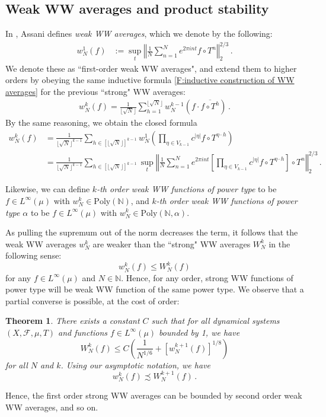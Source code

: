 \documentclass[11pt, oneside]{amsart}   	%
\newcommand{\1}{\mathbbm{1}}
\newcommand{\N}{\mathbb{N}}
\newcommand{\floor}[1]{\lfloor#1\rfloor}
\newtheorem{theorem}{Theorem}[section]
\theoremstyle{definition}
\begin{document}
\subsection{Weak WW averages and product stability}\label{S:WWW}

In \cite{assani04}, Assani defines \textit{weak WW averages}, which we denote by the following:
\begin{align*}
    w_N^1(f) &:= \sup_t \left\Vert \frac{1}{N} \sum_{n=1}^N e^{2\pi i n t} f \circ T^n \right\Vert_2^{2/3} \, .
\end{align*}
We denote these as ``first-order weak WW averages", and extend them to higher orders by obeying the same inductive formula \ref{F:inductive construction of WW averages} for the previous ``strong" WW averages:
\begin{align}\label{F:inductive construction of weak WW averages}
w^{k}_N(f) = \frac{1}{\floor{\sqrt{N}}}\sum_{h=1}^{\floor{\sqrt{N}}} w^{k-1}_N \left( f \cdot \overline{f \circ T^h} \right) \, .
\end{align}
By the same reasoning, we obtain the closed formula
\begin{align*}
w^{k}_N(f) &= \frac{1}{\floor{\sqrt{N}}^{k-1}}\sum_{h\in [\floor{\sqrt{N}}]^{k-1}} w^{1}_N \left( \prod_{\eta\in V_{k-1}} c^{|\eta|} f\circ T^{\eta \cdot h} \right) \\
&=\frac{1}{\floor{\sqrt{N}}^{k-1}}\sum_{h\in [\floor{\sqrt{N}}]^{k-1}} \sup_t \left\Vert \frac{1}{N} \sum_{n=1}^N e^{2\pi i n t}\left[\prod_{\eta\in V_{k-1}} c^{|\eta|} f\circ T^{\eta \cdot h} \right]\circ T^n \right\Vert_2^{2/3} \, .
\end{align*}

Likewise, we can define \textit{$k$-th order weak WW functions of power type} to be $f\in L^\infty(\mu)$ with $w_N^k \in \text{Poly}(\N)$, and \textit{$k$-th order weak WW functions of power type $\alpha$} to be $f\in L^\infty(\mu)$ with $w_N^k \in \text{Poly}(\N, \alpha)$.

As pulling the supremum out of the norm decreases the term, it follows that the weak WW averages $w_N^k$ are weaker than the ``strong" WW averages $W_N^k$ in the following sense:
$$w_N^k(f) \leq W_N^k(f)$$
for any $f\in L^\infty(\mu)$ and $N\in\N$. Hence, for any order, strong WW functions of power type will be weak WW function of the same power type. We observe that a partial converse is possible, at the cost of order:

\begin{theorem}\label{T:converse bound for weak WW averages}
There exists a constant $C$ such that for all dynamical systems $(X, \mathcal{F}, \mu, T)$ and functions $f\in L^\infty(\mu)$ bounded by 1, we have
$$W_N^k(f) \leq C\left(\frac{1}{N^{1/6}} + \left[w_N^{k+1}(f)\right]^{1/8} \right)$$
for all $N$ and $k$. Using our asymptotic notation, we have
$$w_N^k(f) \precsim W_N^{k+1}(f)\, .$$
\end{theorem}
Hence, the first order strong WW averages can be bounded by second order weak WW averages, and so on. 
\end{document}
